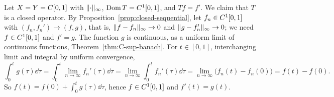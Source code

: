 \begin{example}[Differentiation]\label{ex:diff-closed}
Let $X = Y = C[0,1]$ with $\lVert\cdot\rVert_\infty$,
$\operatorname{Dom} T = C^{1}[0,1]$, and $Tf = f'$. We claim that $T$ is
a closed operator. By Proposition~\ref{prop:closed-sequential}, let
$f_n \in C^{1}[0,1]$ with $(f_n, f_n') \to (f, g)$, that is,
$\lVert f - f_n\rVert_\infty \to 0$ and $\lVert g - f_n'\rVert_\infty \to 0$; we need
$f \in C^{1}[0,1]$ and $f' = g$. The function $g$ is continuous, as a
uniform limit of continuous functions, Theorem~\ref{thm:C-sup-banach}. For
$t \in [0,1]$, interchanging limit and integral by uniform convergence,
\[
  \int_0^t g(\tau) \dd\tau = \int_0^t \lim_{n \to \infty} f_n'(\tau) \dd\tau
  = \lim_{n \to \infty} \int_0^t f_n'(\tau) \dd\tau
  = \lim_{n \to \infty} \bigl(f_n(t) - f_n(0)\bigr) = f(t) - f(0) .
\]
So $f(t) = f(0) + \int_0^t g(\tau) \dd\tau$, hence $f \in C^{1}[0,1]$ and
$f'(t) = g(t)$.
\end{example}
